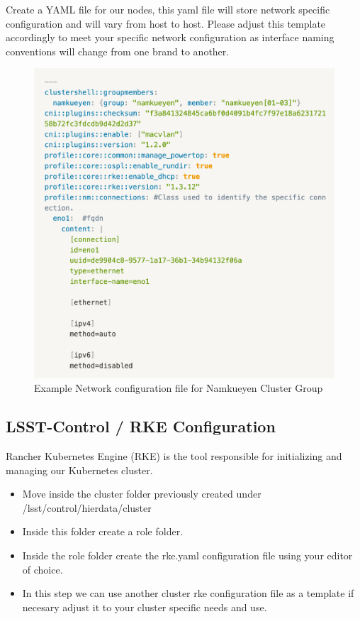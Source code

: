 \vfill\eject

Create a YAML file for our nodes, this yaml file will store network specific configuration and will vary from host to host. Please adjust this template accordingly to meet your specific network configuration as interface naming conventions will change from one brand to another.


\begin{figure}
\includegraphics[width=12cm]{Images/Image5.png}
\centering
\caption{Example Network configuration file for Namkueyen Cluster Group}
\end{figure}

\vfill\eject


\subsection{LSST-Control / RKE Configuration}

Rancher Kubernetes Engine (RKE) is the tool responsible for initializing and managing our Kubernetes cluster.

\begin{itemize}
    \item Move inside the cluster folder previously created under /lsst/control/hierdata/cluster
    \item Inside this folder create a role folder.
    \item Inside the role folder create the rke.yaml configuration file using your editor of choice.
    \item In this step we can use another cluster rke configuration file as a template if necesary adjust it to your cluster specific needs and use.
\end{itemize}

